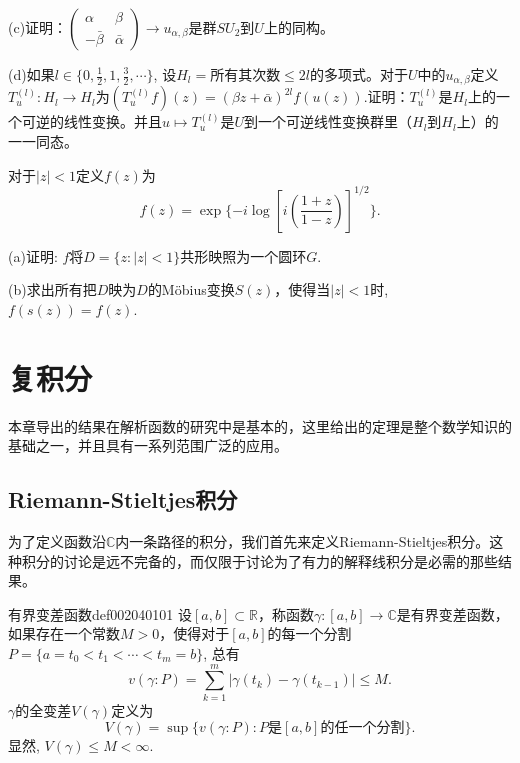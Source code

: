 \begin{problemset}
(c)证明：$\begin{pmatrix}\alpha & \beta \\ -\bar{\beta} & \bar{\alpha}\end{pmatrix} \to u_{\alpha, \beta}$是群$SU_2$到$U$上的同构。

(d)如果$l \in \{0, \frac{1}{2}, 1, \frac{3}{2}, \cdots\}$, 设$H_l=$所有其次数$\le 2l$的多项式。对于$U$中的$u_{\alpha,\beta}$定义$T_u^{(l)}:H_l \to H_l$为$(T_u^{(l)}f)(z) = (\beta{}z+\bar{\alpha})^{2l}f(u(z))$.证明：$T_u^{(l)}$是$H_l$上的一个可逆的线性变换。并且$u \mapsto T_u^{(l)}$是$U$到一个可逆线性变换群里（$H_l$到$H_l$上）的一一同态。

\item 对于$|z|<1$定义$f(z)$为
\[
f(z) = \exp\{-i\log{[i(\frac{1+z}{1-z})]^{1/2}}\}.
\]

(a)证明: $f$将$D = \{z:|z|<1\}$共形映照为一个圆环$G$.

(b)求出所有把$D$映为$D$的M\"obius变换$S(z)$，使得当$|z|<1$时,$f(s(z)) = f(z)$.
\end{problemset}


\chapter{复积分}\label{chapter00204}
本章导出的结果在解析函数的研究中是基本的，这里给出的定理是整个数学知识的基础之一，并且具有一系列范围广泛的应用。

\section{Riemann-Stieltjes积分}\label{section0020401}
为了定义函数沿$\mathbb{C}$内一条路径的积分，我们首先来定义Riemann-Stieltjes积分。这种积分的讨论是远不完备的，而仅限于讨论为了有力的解释线积分是必需的那些结果。

\begin{definition}{有界变差函数}{def002040101}
设$[a, b] \subset \mathbb{R}$，称函数$\gamma:[a, b] \to \mathbb{C}$是有界变差函数，如果存在一个常数$M>0$，使得对于$[a,b]$的每一个分割$P=\{a=t_0 < t_1<\cdots<t_m=b\}$, 总有
\[
v(\gamma:P) = \sum_{k=1}^{m}{|\gamma(t_k) - \gamma(t_{k-1})|} \le M.
\]
$\gamma$的全变差$V(\gamma)$定义为
\[
V(\gamma) = \sup\{v(\gamma:P):P\text{是}[a,b]\text{的任一个分割}\}.
\]
显然, $V(\gamma) \le M < \infty$.
\end{definition}

